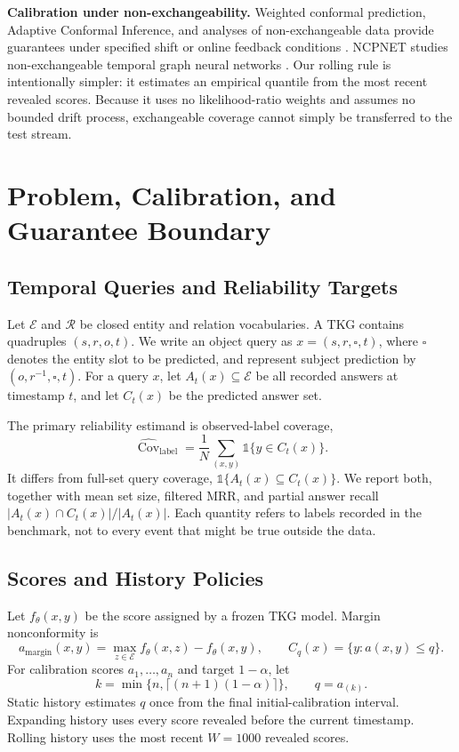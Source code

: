 \documentclass[information,article,submit,oneauthor,pdftex]{Definitions/mdpi}
\newcommand{\cov}{\operatorname{Cov}}
\begin{document}
\textbf{Calibration under non-exchangeability.}
Weighted conformal prediction, Adaptive Conformal Inference, and analyses of
non-exchangeable data provide guarantees under specified shift or online
feedback conditions
\cite{tibshirani2019covariate,gibbs2021adaptive,barber2023beyond,farinhas2024nexcrc}.
NCPNET studies non-exchangeable temporal graph neural networks
\cite{wang2025ncpnet}. Our rolling rule is intentionally simpler: it estimates
an empirical quantile from the most recent revealed scores. Because it uses no
likelihood-ratio weights and assumes no bounded drift process, exchangeable
coverage cannot simply be transferred to the test stream.

\section{Problem, Calibration, and Guarantee Boundary}
\label{sec:method}

\subsection{Temporal Queries and Reliability Targets}

Let \(\mathcal{E}\) and \(\mathcal{R}\) be closed entity and relation
vocabularies. A TKG contains quadruples \((s,r,o,t)\). We write an object query
as \(x=(s,r,\square,t)\), where \(\square\) denotes the entity slot to be
predicted, and represent subject prediction by \((o,r^{-1},\square,t)\). For a
query \(x\), let \(A_t(x)\subseteq\mathcal{E}\) be all recorded answers at
timestamp \(t\), and let \(C_t(x)\) be the predicted answer set.

The primary reliability estimand is observed-label coverage,
\[
  \widehat{\cov}_{\mathrm{label}}
  =\frac{1}{N}\sum_{(x,y)}\mathbb{1}\{y\in C_t(x)\}.
\]
It differs from full-set query coverage,
\(\mathbb{1}\{A_t(x)\subseteq C_t(x)\}\). We report both, together with mean
set size, filtered MRR, and partial answer recall
\(|A_t(x)\cap C_t(x)|/|A_t(x)|\). Each quantity refers to labels recorded in
the benchmark, not to every event that might be true outside the data.

\subsection{Scores and History Policies}

Let \(f_\theta(x,y)\) be the score assigned by a frozen TKG model. Margin
nonconformity is
\[
 a_{\mathrm{margin}}(x,y)=\max_{z\in\mathcal{E}}f_\theta(x,z)-f_\theta(x,y),
 \qquad C_q(x)=\{y:a(x,y)\le q\}.
 \tag{1}\label{eq:margin}
\]
For calibration scores \(a_1,\ldots,a_n\) and target \(1-\alpha\), let
\[
 k=\min\{n,\lceil(n+1)(1-\alpha)\rceil\},\qquad q=a_{(k)}.
 \tag{2}\label{eq:quantile}
\]
Static history estimates \(q\) once from the final initial-calibration interval.
Expanding history uses every score revealed before the current timestamp.
Rolling history uses the most recent \(W=1000\) revealed scores.
\end{document}
